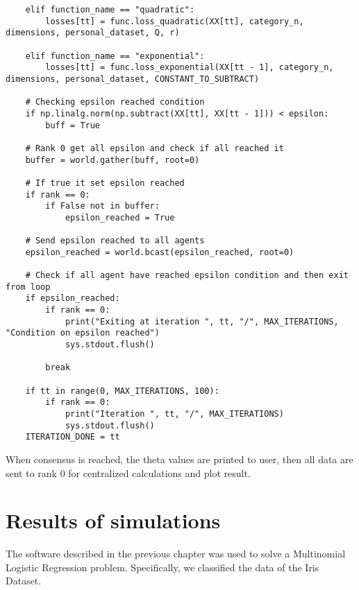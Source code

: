 \documentclass[a4paper,11pt,oneside]{book}
\begin{document}
\begin{lstlisting}
    elif function_name == "quadratic":
        losses[tt] = func.loss_quadratic(XX[tt], category_n, dimensions, personal_dataset, Q, r)

    elif function_name == "exponential":
        losses[tt] = func.loss_exponential(XX[tt - 1], category_n, dimensions, personal_dataset, CONSTANT_TO_SUBTRACT)

    # Checking epsilon reached condition
    if np.linalg.norm(np.subtract(XX[tt], XX[tt - 1])) < epsilon:
        buff = True

    # Rank 0 get all epsilon and check if all reached it
    buffer = world.gather(buff, root=0)

    # If true it set epsilon reached
    if rank == 0:
        if False not in buffer:
            epsilon_reached = True

    # Send epsilon reached to all agents
    epsilon_reached = world.bcast(epsilon_reached, root=0)

    # Check if all agent have reached epsilon condition and then exit from loop
    if epsilon_reached:
        if rank == 0:
            print("Exiting at iteration ", tt, "/", MAX_ITERATIONS, "Condition on epsilon reached")
            sys.stdout.flush()

        break

    if tt in range(0, MAX_ITERATIONS, 100):
        if rank == 0:
            print("Iteration ", tt, "/", MAX_ITERATIONS)
            sys.stdout.flush()
    ITERATION_DONE = tt
\end{lstlisting}

When consensus is reached, the theta values are printed to user, then all data are sent to rank 0 for centralized
calculations and plot result.



\chapter{Results of simulations} \label{Cap2}
The software described in the previous chapter was used to solve a Multinomial Logistic Regression problem. Specifically, we classified the data of the Iris Dataset.
\end{document}
